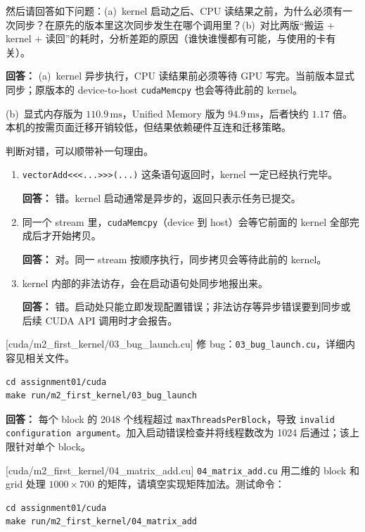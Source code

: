 \documentclass[11pt,a4paper,fontset=windows]{ctexart}
\begin{document}
然后请回答如下问题：(a)~kernel 启动之后、CPU 读结果之前，为什么必须有一次同步？在原先的版本里这次同步发生在哪个调用里？(b)~对比两版“搬运 + kernel + 读回”的耗时，分析差距的原因（谁快谁慢都有可能，与使用的卡有关）。

\par\textbf{回答：} (a)~kernel 异步执行，CPU 读结果前必须等待 GPU 写完。当前版本显式同步；原版本的 device-to-host \texttt{cudaMemcpy} 也会等待此前的 kernel。

(b)~显式内存版为 $110.9\,\mathrm{ms}$，Unified Memory 版为 $94.9\,\mathrm{ms}$，后者快约 $1.17$ 倍。本机的按需页面迁移开销较低，但结果依赖硬件互连和迁移策略。

判断对错，可以顺带补一句理由。
\begin{enumerate}[label=(\alph*)]
  \item \texttt{vectorAdd<<<...>>>(...)} 这条语句返回时，kernel 一定已经执行完毕。
  \par\textbf{回答：} 错。kernel 启动通常是异步的，返回只表示任务已提交。
  \item 同一个 stream 里，\texttt{cudaMemcpy}（device 到 host）会等它前面的 kernel 全部完成后才开始拷贝。
  \par\textbf{回答：} 对。同一 stream 按顺序执行，同步拷贝会等待此前的 kernel。
  \item kernel 内部的非法访存，会在启动语句处同步地报出来。
  \par\textbf{回答：} 错。启动处只能立即发现配置错误；非法访存等异步错误要到同步或后续 CUDA API 调用时才会报告。
\end{enumerate}

[cuda/m2\_first\_kernel/03\_bug\_launch.cu]
修 bug：\texttt{03\_bug\_launch.cu}，详细内容见相关文件。

\begin{lstlisting}
cd assignment01/cuda
make run/m2_first_kernel/03_bug_launch
\end{lstlisting}

\par\textbf{回答：} 每个 block 的 2048 个线程超过 \texttt{maxThreadsPerBlock}，导致 \texttt{invalid configuration argument}。加入启动错误检查并将线程数改为 1024 后通过；该上限针对单个 block。

[cuda/m2\_first\_kernel/04\_matrix\_add.cu]
\texttt{04\_matrix\_add.cu} 用二维的 block 和 grid 处理 $1000 \times 700$ 的矩阵，请填空实现矩阵加法。测试命令：

\begin{lstlisting}
cd assignment01/cuda
make run/m2_first_kernel/04_matrix_add
\end{lstlisting}
\end{document}
